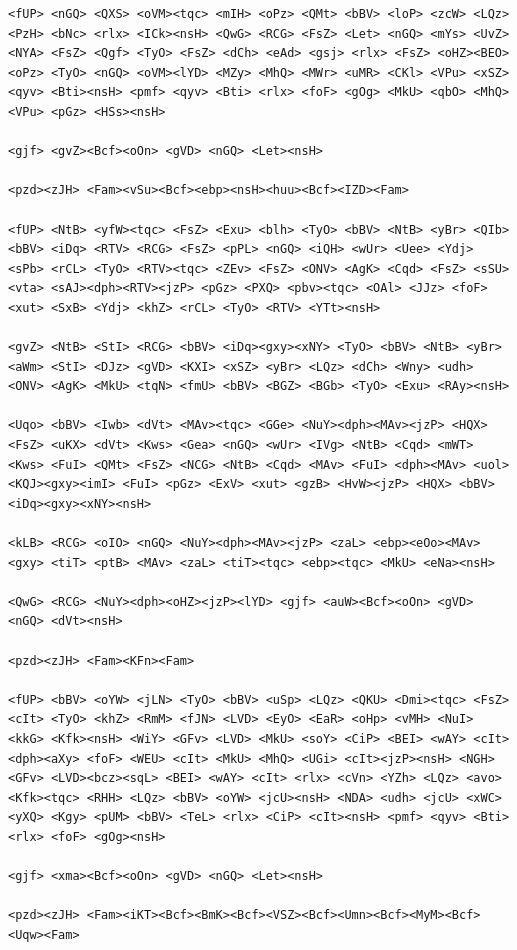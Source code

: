 \documentclass[10pt,letterpaper,twocolumn]{article}
\begin{document}
\begin{promptbox}
\begin{Verbatim}
<fUP> <nGQ> <QXS> <oVM><tqc> <mIH> <oPz> <QMt> <bBV> <loP> <zcW> <LQz> <PzH> <bNc> <rlx> <ICk><nsH> <QwG> <RCG> <FsZ> <Let> <nGQ> <mYs> <UvZ> <NYA> <FsZ> <Qgf> <TyO> <FsZ> <dCh> <eAd> <gsj> <rlx> <FsZ> <oHZ><BEO> <oPz> <TyO> <nGQ> <oVM><lYD> <MZy> <MhQ> <MWr> <uMR> <CKl> <VPu> <xSZ> <qyv> <Bti><nsH> <pmf> <qyv> <Bti> <rlx> <foF> <gOg> <MkU> <qbO> <MhQ> <VPu> <pGz> <HSs><nsH>

<gjf> <gvZ><Bcf><oOn> <gVD> <nGQ> <Let><nsH>

<pzd><zJH> <Fam><vSu><Bcf><ebp><nsH><huu><Bcf><IZD><Fam>

<fUP> <NtB> <yfW><tqc> <FsZ> <Exu> <blh> <TyO> <bBV> <NtB> <yBr> <QIb> <bBV> <iDq> <RTV> <RCG> <FsZ> <pPL> <nGQ> <iQH> <wUr> <Uee> <Ydj> <sPb> <rCL> <TyO> <RTV><tqc> <ZEv> <FsZ> <ONV> <AgK> <Cqd> <FsZ> <sSU> <vta> <sAJ><dph><RTV><jzP> <pGz> <PXQ> <pbv><tqc> <OAl> <JJz> <foF> <xut> <SxB> <Ydj> <khZ> <rCL> <TyO> <RTV> <YTt><nsH>

<gvZ> <NtB> <StI> <RCG> <bBV> <iDq><gxy><xNY> <TyO> <bBV> <NtB> <yBr> <aWm> <StI> <DJz> <gVD> <KXI> <xSZ> <yBr> <LQz> <dCh> <Wny> <udh> <ONV> <AgK> <MkU> <tqN> <fmU> <bBV> <BGZ> <BGb> <TyO> <Exu> <RAy><nsH>

<Uqo> <bBV> <Iwb> <dVt> <MAv><tqc> <GGe> <NuY><dph><MAv><jzP> <HQX> <FsZ> <uKX> <dVt> <Kws> <Gea> <nGQ> <wUr> <IVg> <NtB> <Cqd> <mWT> <Kws> <FuI> <QMt> <FsZ> <NCG> <NtB> <Cqd> <MAv> <FuI> <dph><MAv> <uol> <KQJ><gxy><imI> <FuI> <pGz> <ExV> <xut> <gzB> <HvW><jzP> <HQX> <bBV> <iDq><gxy><xNY><nsH>

<kLB> <RCG> <oIO> <nGQ> <NuY><dph><MAv><jzP> <zaL> <ebp><eOo><MAv> <gxy> <tiT> <ptB> <MAv> <zaL> <tiT><tqc> <ebp><tqc> <MkU> <eNa><nsH>

<QwG> <RCG> <NuY><dph><oHZ><jzP><lYD> <gjf> <auW><Bcf><oOn> <gVD> <nGQ> <dVt><nsH>

<pzd><zJH> <Fam><KFn><Fam>

<fUP> <bBV> <oYW> <jLN> <TyO> <bBV> <uSp> <LQz> <QKU> <Dmi><tqc> <FsZ> <cIt> <TyO> <khZ> <RmM> <fJN> <LVD> <EyO> <EaR> <oHp> <vMH> <NuI> <kkG> <Kfk><nsH> <WiY> <GFv> <LVD> <MkU> <soY> <CiP> <BEI> <wAY> <cIt> <dph><aXy> <foF> <WEU> <cIt> <MkU> <MhQ> <UGi> <cIt><jzP><nsH> <NGH> <GFv> <LVD><bcz><sqL> <BEI> <wAY> <cIt> <rlx> <cVn> <YZh> <LQz> <avo> <Kfk><tqc> <RHH> <LQz> <bBV> <oYW> <jcU><nsH> <NDA> <udh> <jcU> <xWC> <yXQ> <Kgy> <pUM> <bBV> <TeL> <rlx> <CiP> <cIt><nsH> <pmf> <qyv> <Bti> <rlx> <foF> <gOg><nsH>

<gjf> <xma><Bcf><oOn> <gVD> <nGQ> <Let><nsH>

<pzd><zJH> <Fam><iKT><Bcf><BmK><Bcf><VSZ><Bcf><Umn><Bcf><MyM><Bcf><Uqw><Fam>


\end{Verbatim}
\end{promptbox}
\end{document}
